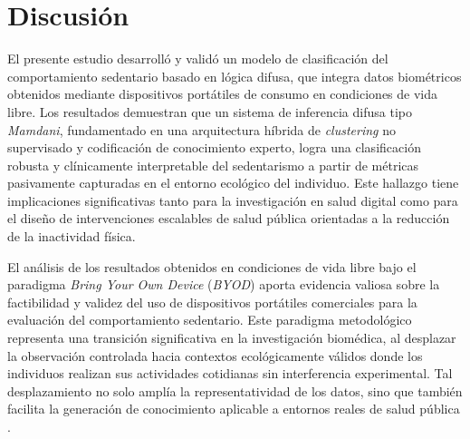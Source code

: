 
\chapter{Discusión}
\label{cap:discusion}


\noindent El presente estudio desarrolló y validó un modelo de clasificación del comportamiento sedentario basado en lógica difusa, que integra datos biométricos obtenidos mediante dispositivos portátiles de consumo en condiciones de vida libre. Los resultados demuestran que un sistema de inferencia difusa tipo \textit{Mamdani}, fundamentado en una arquitectura híbrida de \textit{clustering} no supervisado y codificación de conocimiento experto, logra una clasificación robusta y clínicamente interpretable del sedentarismo a partir de métricas pasivamente capturadas en el entorno ecológico del individuo. Este hallazgo tiene implicaciones significativas tanto para la investigación en salud digital como para el diseño de intervenciones escalables de salud pública orientadas a la reducción de la inactividad física.

El análisis de los resultados obtenidos en condiciones de vida libre bajo el paradigma \textit{Bring Your Own Device} (\textit{BYOD}) aporta evidencia valiosa sobre la factibilidad y validez del uso de dispositivos portátiles comerciales para la evaluación del comportamiento sedentario. Este paradigma metodológico representa una transición significativa en la investigación biomédica, al desplazar la observación controlada hacia contextos ecológicamente válidos donde los individuos realizan sus actividades cotidianas sin interferencia experimental. Tal desplazamiento no solo amplía la representatividad de los datos, sino que también facilita la generación de conocimiento aplicable a entornos reales de salud pública \cite{Doherty2021,Liu2022}.

